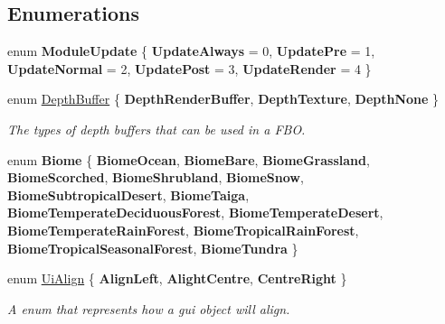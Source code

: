 \subsection*{Enumerations}
\begin{DoxyCompactItemize}
\item 
\mbox{\label{namespace_flounder_a9ca4a1923878a592b62236a9f4c6ba43}} 
enum {\bfseries Module\+Update} \{ \newline
{\bfseries Update\+Always} = 0, 
{\bfseries Update\+Pre} = 1, 
{\bfseries Update\+Normal} = 2, 
{\bfseries Update\+Post} = 3, 
\newline
{\bfseries Update\+Render} = 4
 \}
\item 
enum \hyperlink{namespace_flounder_aa9068c36d11b70ffe0a222a006304278}{Depth\+Buffer} \{ {\bfseries Depth\+Render\+Buffer}, 
{\bfseries Depth\+Texture}, 
{\bfseries Depth\+None}
 \}\begin{DoxyCompactList}\small\item\em The types of depth buffers that can be used in a F\+BO. \end{DoxyCompactList}
\item 
\mbox{\label{namespace_flounder_a2485d8c2ce2381463983d5c7819ef5fc}} 
enum {\bfseries Biome} \{ \newline
{\bfseries Biome\+Ocean}, 
{\bfseries Biome\+Bare}, 
{\bfseries Biome\+Grassland}, 
{\bfseries Biome\+Scorched}, 
\newline
{\bfseries Biome\+Shrubland}, 
{\bfseries Biome\+Snow}, 
{\bfseries Biome\+Subtropical\+Desert}, 
{\bfseries Biome\+Taiga}, 
\newline
{\bfseries Biome\+Temperate\+Deciduous\+Forest}, 
{\bfseries Biome\+Temperate\+Desert}, 
{\bfseries Biome\+Temperate\+Rain\+Forest}, 
{\bfseries Biome\+Tropical\+Rain\+Forest}, 
\newline
{\bfseries Biome\+Tropical\+Seasonal\+Forest}, 
{\bfseries Biome\+Tundra}
 \}
\item 
enum \hyperlink{namespace_flounder_a561db2012ae4152be62bcd882407d361}{Ui\+Align} \{ {\bfseries Align\+Left}, 
{\bfseries Alight\+Centre}, 
{\bfseries Centre\+Right}
 \}\begin{DoxyCompactList}\small\item\em A enum that represents how a gui object will align. \end{DoxyCompactList}
\end{DoxyCompactItemize}
